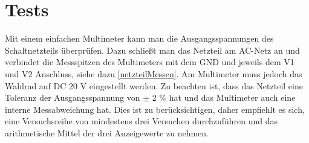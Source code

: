 \section{Tests}
Mit einem einfachen Multimeter kann man die Ausgangsspannungen des Schaltnetzteils überprüfen. Dazu schließt man das Netzteil am AC-Netz an und verbindet die Messspitzen des Multimeters mit dem GND und jeweils dem V1 und V2 Anschluss, siehe dazu \ref{netzteilMessen}. Am Multimeter muss jedoch das Wahlrad auf DC 20 V eingestellt werden. Zu beachten ist, dass das Netzteil eine Toleranz der Ausgangsspannung von $\pm$ 2 \% hat und das Multimeter auch eine interne Messabweichung hat. Dies ist zu berücksichtigen, daher empfiehlt es sich, eine Versuchsreihe von mindestens drei Versuchen durchzuführen und das arithmetische Mittel der drei Anzeigewerte zu nehmen.

